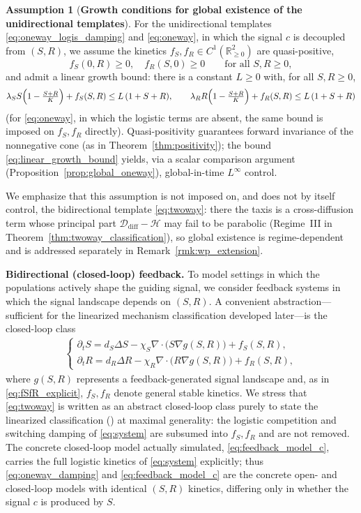 \documentclass[pdflatex,sn-mathphys-ay]{sn-jnl}
\theoremstyle{thmstyleone}
\theoremstyle{definition}
\newtheorem{assumption}[theorem]{Assumption}
\theoremstyle{remark}
\begin{document}
\begin{assumption}[\textbf{Growth conditions for global existence of the unidirectional templates}]
\label{ass:reaction_growth}
For the unidirectional templates \eqref{eq:oneway_logis_damping} and
\eqref{eq:oneway}, in which the signal $c$ is decoupled from $(S,R)$, we assume the
kinetics $f_S,f_R\in C^1(\mathbb R_{\ge 0}^2)$ are quasi-positive,
\[
f_S(0,R)\ge 0,\quad f_R(S,0)\ge 0\qquad\text{for all }S,R\ge 0,
\]
and admit a linear growth bound: there is a constant $L\ge 0$ with, for all
$S,R\ge 0$,
\begin{equation}
\label{eq:linear_growth_bound}
\lambda_S S\Bigl(1-\tfrac{S+R}{K}\Bigr)+f_S(S,R)\le L\,(1+S+R),
\qquad
\lambda_R R\Bigl(1-\tfrac{S+R}{K}\Bigr)+f_R(S,R)\le L\,(1+S+R)
\end{equation}
(for \eqref{eq:oneway}, in which the logistic terms are absent, the same bound is
imposed on $f_S,f_R$ directly). Quasi-positivity guarantees forward invariance of
the nonnegative cone (as in Theorem~\ref{thm:positivity}); the bound
\eqref{eq:linear_growth_bound} yields, via a scalar comparison argument
(Proposition~\ref{prop:global_oneway}), global-in-time $L^\infty$ control.

We emphasize that this assumption is not imposed on, and does not by itself
control, the bidirectional template \eqref{eq:twoway}: there the taxis is a
cross-diffusion term whose principal part $\mathcal D_{\mathrm{diff}}-\mathcal H$ may
fail to be parabolic (Regime~III in Theorem~\ref{thm:twoway_classification}), so global existence is regime-dependent and is
addressed separately in Remark~\ref{rmk:wp_extension}.
\end{assumption}

\medskip
\noindent\textbf{Bidirectional (closed-loop) feedback.}
To model settings in which the populations actively shape the guiding signal, we consider feedback systems in which the signal landscape depends on $(S,R)$. 
A convenient abstraction---sufficient for the linearized mechanism classification developed later---is the closed-loop class
\begin{align}
\label{eq:twoway}
\begin{cases}
\partial_t S = d_S\Delta S - \chi_S\nabla\cdot\!\bigl(S\nabla g(S,R)\bigr) + f_S(S,R), \\[2pt]
\partial_t R = d_R\Delta R - \chi_R\nabla\cdot\!\bigl(R\nabla g(S,R)\bigr) + f_R(S,R),
\end{cases}
\end{align}
where $g(S,R)$ represents a feedback-generated signal landscape and, as in
\eqref{eq:fSfR_explicit}, $f_S,f_R$ denote general stable kinetics. We stress
that \eqref{eq:twoway} is written as an abstract closed-loop class purely
to state the linearized classification () at
maximal generality: the logistic competition and switching damping of
\eqref{eq:system} are subsumed into $f_S,f_R$ and are not removed. The
concrete closed-loop model actually simulated, \eqref{eq:feedback_model_c},
carries the full logistic kinetics of \eqref{eq:system} explicitly; thus
\eqref{eq:oneway_damping} and \eqref{eq:feedback_model_c} are the concrete
open- and closed-loop models with identical $(S,R)$ kinetics, differing only in
whether the signal $c$ is produced by $S$.
\end{document}

